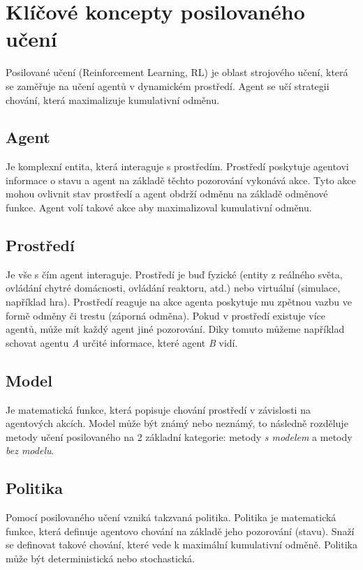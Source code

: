 \section{Klíčové koncepty posilovaného učení}
Posilované učení (Reinforcement Learning, RL) je oblast strojového učení, která se zaměřuje na učení agentů v dynamickém prostředí.
Agent se učí strategii chování, která maximalizuje kumulativní odměnu.

\subsection{Agent}

Je komplexní entita, která interaguje s prostředím.
Prostředí poskytuje agentovi informace o stavu a agent na základě těchto pozorování vykonává akce.
Tyto akce mohou ovlivnit stav prostředí a agent obdrží odměnu na základě odměnové funkce.
Agent volí takové akce aby maximalizoval kumulativní odměnu.

\subsection{Prostředí}

Je vše s čím agent interaguje.
Prostředí je buď fyzické (entity z reálného světa, ovládání chytré domácnosti, ovládání reaktoru, atd.) nebo virtuální (simulace, například hra).
Prostředí reaguje na akce agenta poskytuje mu zpětnou vazbu ve formě odměny či trestu (záporná odměna).
Pokud v prostředí existuje více agentů, může mít každý agent jiné pozorování.
Diky tomuto můžeme například schovat agentu \textit{A} určité informace, které agent \textit{B} vidí.

\subsection{Model}

Je matematická funkce, která popisuje chování prostředí v závislosti na agentových akcích.
Model může být známý nebo neznámý, to následně rozděluje metody učení posilovaného na 2 základní kategorie: metody \emph{s modelem} a metody \emph{ bez modelu}.


\subsection{Politika}

Pomocí posilovaného učení vzniká takzvaná politika.
Politika je matematická funkce, která definuje agentovo chování na základě jeho pozorování (stavu).
Snaží se definovat takové chování, které vede k maximální kumulativní odměně.
Politika může být deterministická nebo stochastická.


